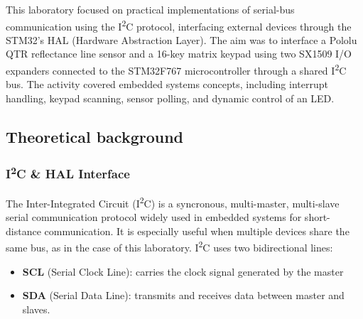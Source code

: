 This laboratory focused on practical implementations of serial-bus communication using the I\textsuperscript{2}C protocol, interfacing external devices through the STM32's HAL (Hardware Abstraction Layer). 
The aim was to interface a Pololu QTR reflectance line sensor and a 16-key matrix keypad using two SX1509 I/O expanders connected to the STM32F767 microcontroller through a shared I\textsuperscript{2}C bus. 
The activity covered embedded systems concepts, including interrupt handling, keypad scanning, sensor polling, and dynamic control of an LED.

\subsection{Theoretical background}







\subsubsection{I\textsuperscript{2}C \& HAL Interface}

The Inter-Integrated Circuit (I\textsuperscript{2}C) is a syncronous, multi-master, multi-slave serial communication protocol widely used in embedded systems for short-distance communication. 
It is especially useful when multiple devices share the same bus, as in the case of this laboratory. 
I\textsuperscript{2}C uses two bidirectional lines:

\begin{itemize}
    \item \textbf{SCL} (Serial Clock Line): carries the clock signal generated by the master
    \item \textbf{SDA} (Serial Data Line): transmits and receives data between master and slaves.
\end{itemize}


